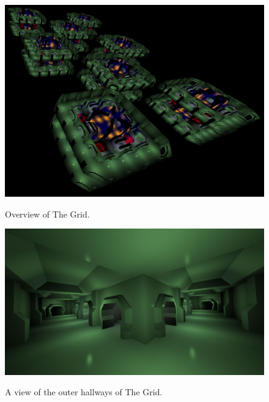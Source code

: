 \documentclass[12pt]{ucthesis}
\newcommand{\captionfonts}{\small\bf\ssp}
\begin{document}
\begin{figure}
\begin{center}
\includegraphics[width=\textwidth]{Images/Grid-Overview.jpg}
\captionfonts
\caption[The Grid Map Overview]{Overview of The Grid.}
\label{fig:grid-overview}

\includegraphics[width=\textwidth]{Images/GridHalls.jpg}
\captionfonts
\caption[Halls of the Grid]{A view of the outer hallways of The Grid.}
\label{fig:grid-halls}
\end{center}
\end{figure}
\end{document}
